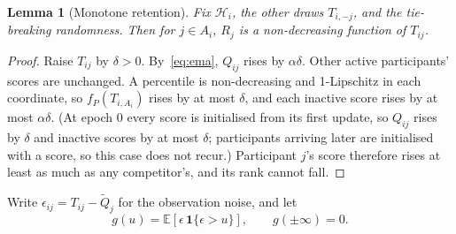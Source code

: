\documentclass[sigconf,anonymous,review,nonacm]{acmart}
\newtheorem{lemma}{Lemma}
\begin{document}
\begin{lemma}[Monotone retention]\label{lem:mono}
Fix $\mathcal H_i$, the other draws $T_{i,-j}$, and the tie-breaking randomness. Then for
$j\in A_i$, $R_j$ is a non-decreasing function of $T_{ij}$.
\end{lemma}
\begin{proof}
Raise $T_{ij}$ by $\delta>0$. By~\eqref{eq:ema}, $Q_{ij}$ rises by $\alpha\delta$. Other
active participants' scores are unchanged. A percentile is non-decreasing and 1-Lipschitz
in each coordinate, so $f_P(T_{i,A_i})$ rises by at most $\delta$, and each inactive score
rises by at most $\alpha\delta$. (At epoch $0$ every score is initialised from its first
update, so $Q_{ij}$ rises by $\delta$ and inactive scores by at most $\delta$; participants
arriving later are initialised with a score, so this case does not recur.) Participant
$j$'s score therefore rises at least as much as any competitor's, and its rank cannot fall.
\end{proof}

Write $\epsilon_{ij}=T_{ij}-\tilde Q_j$ for the observation noise, and let
\begin{equation}\label{eq:g}
g(u)=\mathbb E\!\left[\epsilon\,\mathbf 1\{\epsilon>u\}\right],\qquad g(\pm\infty)=0 .
\end{equation}
\end{document}
